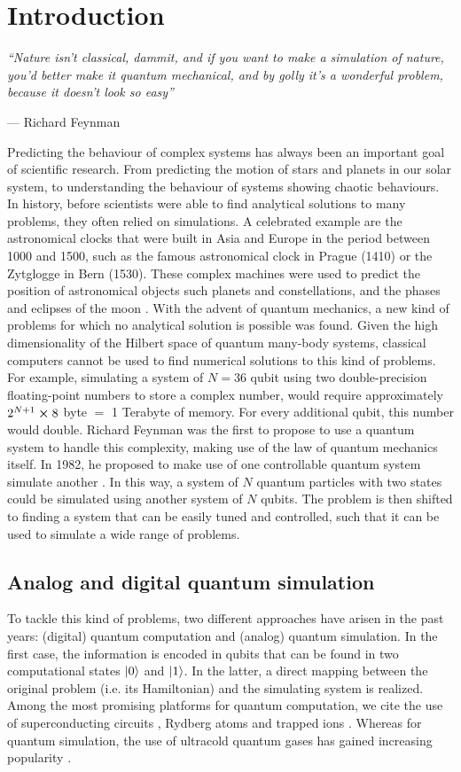 \chapter{Introduction}
\epigraph{\itshape \enquote{Nature isn't classical, dammit, and if you want to make a simulation of nature, you'd better make it quantum mechanical, and by golly it's a wonderful problem, because it doesn't look so easy}}{--- Richard Feynman}

Predicting the behaviour of complex systems has always been an important goal of scientific research. From predicting the motion of stars and planets in our solar system, to understanding the behaviour of systems showing chaotic behaviours. In history, before scientists were able to find analytical solutions to many problems, they often relied on simulations. A
celebrated example are the astronomical clocks that
were built in Asia and Europe in the period between 1000 and
1500, such as the famous astronomical clock in Prague (1410) or the Zytglogge in Bern (1530). These complex machines were used to predict the position of astronomical objects such planets and constellations, and the phases and eclipses of the moon \cite{bloch2012}.
With the advent of quantum mechanics, a new kind of problems for which no analytical solution is possible was found. Given the high dimensionality of the Hilbert space of quantum many-body systems, classical computers cannot be used to find numerical solutions to this kind of problems. For example, simulating a system of $N=36$ qubit using two double-precision floating-point numbers to store a complex number, would require approximately $2^{N+1} \cross 8$ byte $=$ 1 Terabyte of memory. For every additional qubit, this number would double.
Richard Feynman was the first to propose to use a quantum system to handle this complexity, making use of the law of quantum mechanics itself. In 1982, he proposed to make use of one controllable quantum system simulate another \cite{feynman1982}. In this way, a system of $N$ quantum particles with two states could be simulated using another system of $N$ qubits. The problem is then shifted to finding a system that can be easily tuned and controlled, such that it can be used to simulate a wide range of problems.

\section{Analog and digital quantum simulation}

To tackle this kind of problems, two different approaches have arisen in the past years: (digital) quantum computation and (analog) quantum simulation. In the first case, the information is encoded in qubits that can be found in two computational states $\ket{0}$ and $\ket{1}$. In the latter, a direct mapping between the original problem (i.e. its Hamiltonian) and the simulating system is realized. Among the most promising platforms for quantum computation, we cite the use of superconducting circuits \cite{blais2021a}, Rydberg atoms \cite{wu2021a} and trapped ions \cite{bruzewicz2019}. Whereas for quantum simulation, the use of ultracold quantum gases has gained increasing popularity \cite{bloch2012}.

